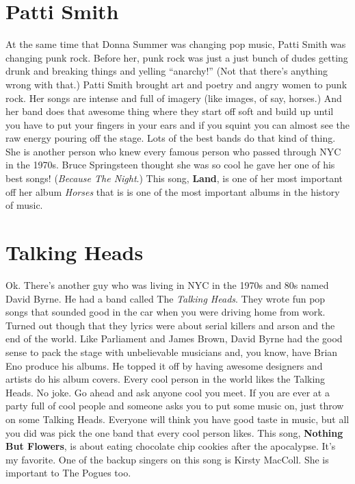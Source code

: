 \documentclass[letterpaper,single]{article}
\begin{document}
\section{Patti Smith}
At the same time that Donna Summer was changing pop music, Patti Smith was changing punk rock. 
Before her, punk rock was just a just bunch of dudes getting drunk and breaking things and yelling ``anarchy!'' (Not that there's anything wrong with that.) 
Patti Smith brought art and poetry and angry women to punk rock. 
Her songs are intense and full of imagery (like images, of say, horses.) 
And her band does that awesome thing where they start off soft and build up until you have to put your fingers in your ears and if you squint you can almost see the raw energy pouring off the stage. 
Lots of the best bands do that kind of thing.
She is another person who knew every famous person who passed through NYC in the 1970s. 
Bruce Springsteen thought she was so cool he gave her one of his best songs! (\emph{Because The Night}.) This song, \textbf{Land}, is one of her most important off her album \emph{Horses} that is is one of the most important albums in the history of music.

\section{Talking Heads}
Ok. There's another guy who was living in NYC in the 1970s and 80s named David Byrne. 
He had a band called The \emph{Talking Heads}. 
They wrote fun pop songs that sounded good in the car when you were driving home from work. 
Turned out though that they lyrics were about serial killers and arson and the end of the world. 
Like Parliament and James Brown, David Byrne had the good sense to pack the stage with unbelievable musicians and, you know, have Brian Eno produce his albums. 
He topped it off by having awesome designers and artists do his album covers. 
Every cool person in the world likes the Talking Heads. 
No joke. 
Go ahead and ask anyone cool you meet. 
If you are ever at a party full of cool people and someone asks you to put some music on, just throw on some Talking Heads. 
Everyone will think you have good taste in music, but all you did was pick the one band that every cool person likes. 
This song, \textbf{Nothing But Flowers}, is about eating chocolate chip cookies after the apocalypse. It's my favorite. 
One of the backup singers on this song is Kirsty MacColl. She is important to The Pogues too.
\end{document}
